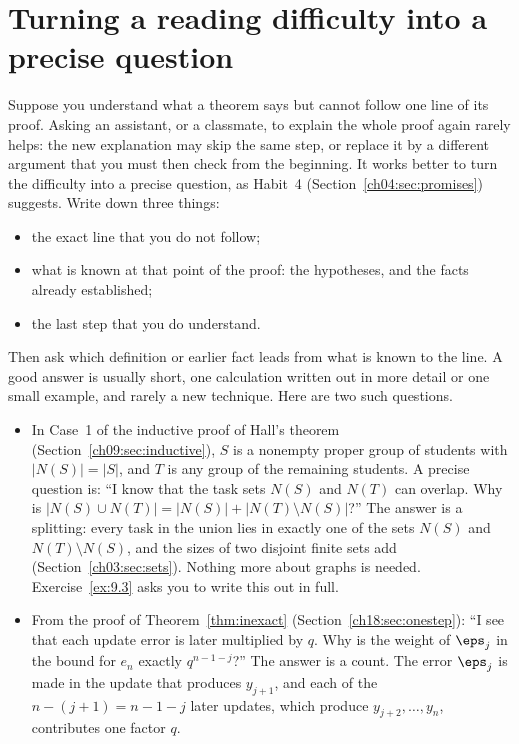 \section{Turning a reading difficulty into a precise question}\label{appE:sec:question}
Suppose you understand what a theorem says but cannot follow one line of its proof. Asking an assistant, or a classmate, to explain the whole proof again rarely helps: the new explanation may skip the same step, or replace it by a different argument that you must then check from the beginning. It works better to turn the difficulty into a precise question, as Habit~4 (Section~\ref{ch04:sec:promises}) suggests. Write down three things:
\begin{itemize}
\item the exact line that you do not follow;
\item what is known at that point of the proof: the hypotheses, and the facts already established;
\item the last step that you do understand.
\end{itemize}
Then ask which definition or earlier fact leads from what is known to the line. A good answer is usually short, one calculation written out in more detail or one small example, and rarely a new technique. Here are two such questions.
\begin{itemize}
\item In Case~1 of the inductive proof of Hall's theorem (Section~\ref{ch09:sec:inductive}), $S$ is a nonempty proper group of students with $|N(S)|=|S|$, and $T$ is any group of the remaining students. A precise question is: ``I know that the task sets $N(S)$ and $N(T)$ can overlap. Why is $|N(S)\cup N(T)|=|N(S)|+|N(T)\setminus N(S)|$?'' The answer is a splitting: every task in the union lies in exactly one of the sets $N(S)$ and $N(T)\setminus N(S)$, and the sizes of two disjoint finite sets add (Section~\ref{ch03:sec:sets}). Nothing more about graphs is needed. Exercise~\ref{ex:9.3} asks you to write this out in full.
\item From the proof of Theorem~\ref{thm:inexact} (Section~\ref{ch18:sec:onestep}): ``I see that each update error is later multiplied by $q$. Why is the weight of $\eps_j$ in the bound for $e_n$ exactly $q^{n-1-j}$?'' The answer is a count. The error $\eps_j$ is made in the update that produces $y_{j+1}$, and each of the $n-(j+1)=n-1-j$ later updates, which produce $y_{j+2},\ldots,y_n$, contributes one factor $q$.
\end{itemize}

